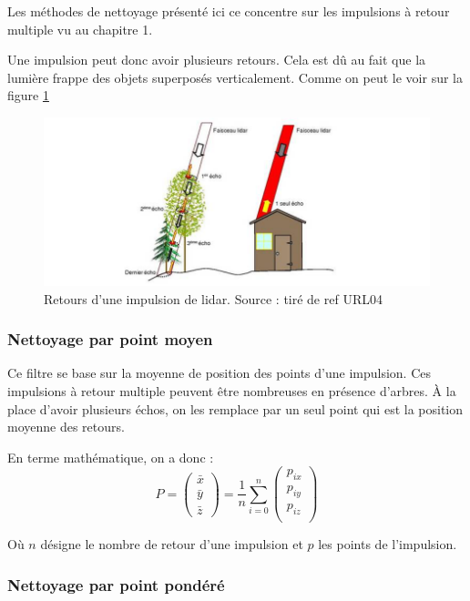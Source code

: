 Les méthodes de nettoyage présenté ici ce concentre sur les impulsions à retour
multiple vu au chapitre 1.

Une impulsion peut donc avoir plusieurs retours. Cela est dû au fait que la
lumière frappe des objets superposés verticalement. Comme on peut le voir sur 
la figure \ref{fig:lidar_echo}

\begin{figure}[htbp!]
    \centering
	\includegraphics[width=0.8\linewidth]{figures/lidar_echo.png}
	\caption{Retours d'une impulsion de lidar. Source : tiré de ref URL04}
	\label{fig:lidar_echo}
\end{figure}



\subsubsection{Nettoyage par point moyen}

Ce filtre se base sur la moyenne de position des points d'une impulsion.
Ces impulsions à retour multiple peuvent être nombreuses en présence d'arbres.
À la place d'avoir plusieurs échos, on les remplace par un seul point qui est la
position moyenne des retours.

En terme mathématique, on a donc : 
$$
P = 
\begin{pmatrix}
    \bar{x} \\
    \bar{y} \\
    \bar{z}
\end{pmatrix}
=
\frac{1}{n}
\sum_{i=0}^{n}
\begin{pmatrix}
   p_{ix} \\
   p_{iy} \\
   p_{iz} \\
\end{pmatrix}
$$

Où $n$ désigne le nombre de retour d'une impulsion et $p$ les points de l'impulsion.



\subsubsection{Nettoyage par point pondéré}


